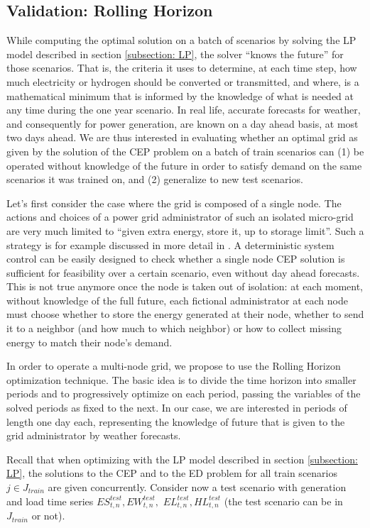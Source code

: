 \documentclass[smallextended,natbib]{svjour3}       %
\numberwithin{theorem}{section}
\begin{document}
\subsection{Validation: Rolling Horizon}\label{subsection: RH}

While computing the optimal solution on a batch of scenarios by solving the LP model described in section \ref{subsection: LP}, the solver ``knows the future'' for those scenarios. 
That is, the criteria it uses to determine, at each time step, how much electricity or hydrogen should be converted or transmitted, and where, is a mathematical minimum that is informed by the knowledge of what is needed at any time during the one year scenario.
In real life, accurate forecasts for weather, and consequently for power generation, are known on a day ahead basis, at most two days ahead. 
We are thus interested in evaluating whether an optimal grid as given by the solution of the CEP problem on a batch of train scenarios can (1) be operated without knowledge of the future in order to satisfy demand on the same scenarios it was trained on, and (2) generalize to new test scenarios.

Let's first consider the case where the grid is composed of a single node. 
The actions and choices of a power grid administrator of such an isolated micro-grid are very much limited to ``given extra energy, store it, up to storage limit''. 
Such a strategy is for example discussed in more detail in \cite{deterministic}. 
A deterministic system control can be easily designed to check whether a single node CEP solution is sufficient for feasibility over a certain scenario, even without day ahead forecasts.
This is not true anymore once the node is taken out of isolation: at each moment, without knowledge of the full future, each fictional administrator at each node must choose whether to store the energy generated at their node, whether to send it to a neighbor (and how much to which neighbor) or how to collect missing energy to match their node's demand.

In order to operate a multi-node grid, we propose to use the Rolling Horizon optimization technique. 
The basic idea is to divide the time horizon into smaller periods and to progressively optimize on each period, passing the variables of the solved periods as fixed to the next. 
In our case, we are interested in periods of length one day each, representing the knowledge of future that is given to the grid administrator by weather forecasts.

Recall that when optimizing with the LP model described in section \ref{subsection: LP}, the solutions to the CEP and to the ED problem for all train scenarios $j\in J_{train}$ are given concurrently. 
Consider now a test scenario with generation and load time series $ES^{test}_{t,n}, EW^{test}_{t,n},$ $EL^{test}_{t,n}, HL^{test}_{t,n}$ (the test scenario can be in $J_{train}$ or not).
\end{document}
